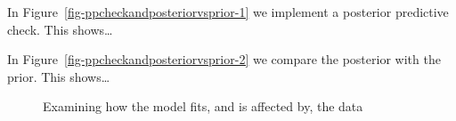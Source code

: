 \documentclass[
  letterpaper,
  DIV=11,
  numbers=noendperiod]{scrartcl}
\begin{document}
In Figure~\ref{fig-ppcheckandposteriorvsprior-1} we implement a
posterior predictive check. This shows\ldots{}

In Figure~\ref{fig-ppcheckandposteriorvsprior-2} we compare the
posterior with the prior. This shows\ldots{}

\begin{figure}

\begin{minipage}{0.50\linewidth}



\end{minipage}%
%
\begin{minipage}{0.50\linewidth}



\end{minipage}%

\caption{\label{fig-ppcheckandposteriorvsprior}Examining how the model
fits, and is affected by, the data}

\end{figure}%
\end{document}
